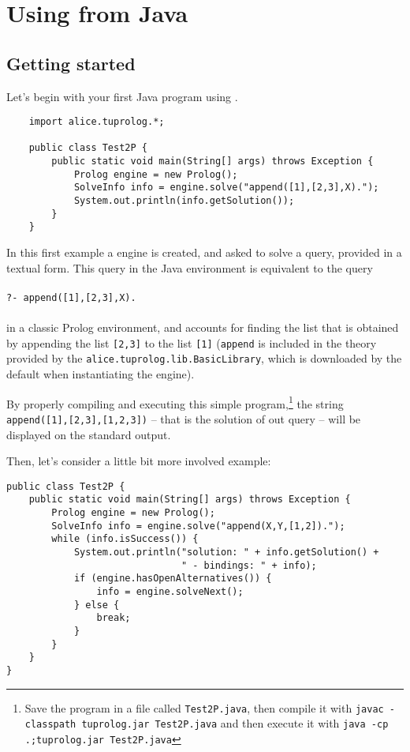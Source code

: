 \chapter{Using \tuprolog{} from Java}
\label{ch:java-api}

\section{Getting started}

Let's begin with your first Java program using \tuprolog{}.
%
{\small{
\begin{verbatim}
    import alice.tuprolog.*;

    public class Test2P {
        public static void main(String[] args) throws Exception {
            Prolog engine = new Prolog();
            SolveInfo info = engine.solve("append([1],[2,3],X).");
            System.out.println(info.getSolution());
        }
    }
\end{verbatim}
}}
\noindent In this first example a \tuprolog{} engine is
created, and asked to solve a query, provided in a textual form.
%
This query in the Java environment is equivalent to the query\\\\
%
{\small{\texttt{?- append([1],[2,3],X).\\\\}}}
%
\noindent in a classic Prolog environment, and accounts for
finding the list that is obtained by appending the list
\texttt{[2,3]} to the list \texttt{[1]} (\texttt{append} is
included in the theory provided by the
\texttt{alice.tuprolog.lib.BasicLibrary}, which is downloaded by
the default when instantiating the engine).
%

By properly compiling and executing this simple program,\footnote{Save the program in a file called \texttt{Test2P.java}, then compile it with
%
\texttt{javac -classpath tuprolog.jar Test2P.java}
%
and then execute it with
%
\texttt{java -cp .;tuprolog.jar Test2P.java}} the string
\texttt{append([1],[2,3],[1,2,3])} -- that is the solution of out
query -- will be displayed on the standard output.
%
%

\noindent Then, let's consider a little bit more involved example:

{\small{
\begin{verbatim}
public class Test2P {
    public static void main(String[] args) throws Exception {
        Prolog engine = new Prolog();
        SolveInfo info = engine.solve("append(X,Y,[1,2]).");
        while (info.isSuccess()) {
            System.out.println("solution: " + info.getSolution() +
                               " - bindings: " + info);
            if (engine.hasOpenAlternatives()) {
                info = engine.solveNext();
            } else {
                break;
            }
        }
    }
}
\end{verbatim}
}}

